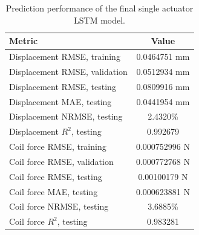 \begin{table}[H]
\centering
\caption{Prediction performance of the final single actuator LSTM model.}
\label{tab:lstm_prediction_metrics_final}
\begin{tabular}{l c}
\toprule
Metric & Value \\ 
\midrule
Displacement RMSE, training & 0.0464751 mm \\ 
Displacement RMSE, validation & 0.0512934 mm \\ 
Displacement RMSE, testing & 0.0809916 mm \\ 
Displacement MAE, testing & 0.0441954 mm \\ 
Displacement NRMSE, testing & 2.4320\% \\ 
Displacement $R^2$, testing & 0.992679 \\ 
Coil force RMSE, training & 0.000752996 N \\ 
Coil force RMSE, validation & 0.000772768 N \\ 
Coil force RMSE, testing & 0.00100179 N \\ 
Coil force MAE, testing & 0.000623881 N \\ 
Coil force NRMSE, testing & 3.6885\% \\ 
Coil force $R^2$, testing & 0.983281 \\ 
\bottomrule
\end{tabular}
\end{table}
